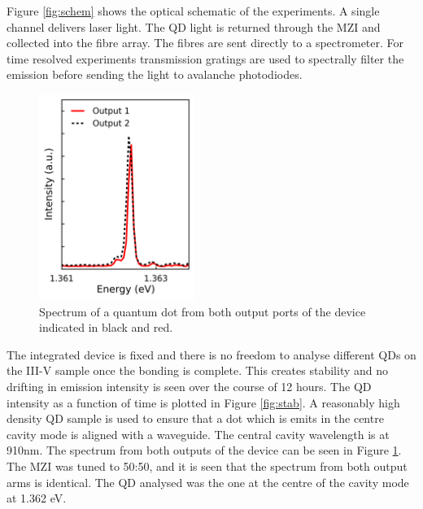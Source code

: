 Figure \ref{fig:schem} shows the optical schematic of the experiments. A single
channel delivers laser light. The QD light is returned through the MZI and
collected into the fibre array. The fibres are sent directly to a spectrometer.
For time resolved experiments transmission gratings are used to spectrally
filter the emission before sending the light to avalanche photodiodes.

\begin{figure}[h!] \begin{center}
\includegraphics[width=0.45\textwidth]{images/spec.png} \caption{
Spectrum of a quantum dot from both output ports of the device indicated in black and red.
} \label{fig:spec} \end{center} \end{figure}

The integrated device is fixed and there is no freedom to analyse different QDs
on the III-V sample once the bonding is complete. This creates stability and no
drifting in emission intensity is seen over the course of 12 hours. The QD
intensity as a function of time is plotted in Figure \ref{fig:stab}. A
reasonably high density QD sample is used to ensure that a dot which is emits in
the centre cavity mode is aligned with a waveguide. The central cavity
wavelength is at 910nm. The spectrum from both outputs of the device can be seen
in Figure \ref{fig:spec}. The MZI was tuned to 50:50, and it is seen that the
spectrum from both output arms is identical. The QD analysed was the one at the
centre of the cavity mode at 1.362 eV.

